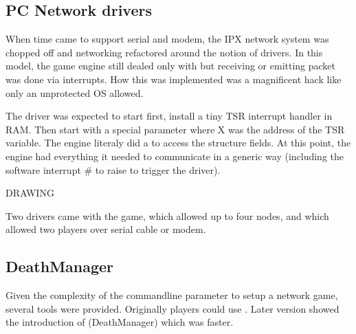 \subsection{PC Network drivers}
When time came to support serial and modem, the IPX network system was chopped off and networking refactored around the notion of drivers. In this model, the game engine still dealed only with  but receiving or emitting packet was done via interrupts. How this was implemented was a magnificent hack like only an unprotected OS allowed.\\
\par
The driver was expected to start first, install a tiny TSR interrupt handler in RAM. Then start  with a special parameter  where X was the address of the TSR  variable. The engine literaly did a  to access the structure fields. At this point, the engine had everything it needed to communicate in a generic way (including the software interrupt \# to raise to trigger the driver).\\
\par
{}
\par
DRAWING\\
\par
Two drivers came with the game,  which allowed up to four nodes, and  which allowed two players over serial cable or modem.\\
\par
\par











\subsection{DeathManager}
Given the complexity of the commandline parameter to setup a network game, several tools were provided. Originally players could use . Later version showed the introduction of (DeathManager) which was faster.\\
\par
{}
